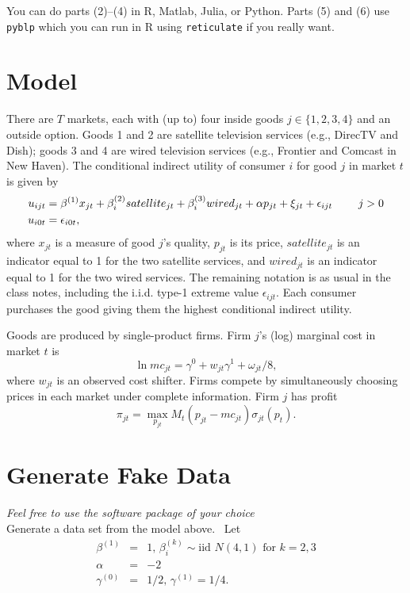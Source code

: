 \documentclass[english,11pt]{article}
\begin{document}
You can do parts (2)--(4) in R, Matlab, Julia, or Python. Parts (5) and (6) use \texttt{pyblp} which you can run in R using \texttt{reticulate} if you really want.
\section{Model}

There are $T$ markets, each with (up to) four inside goods $j\in
\{1,2,3,4\}$ and an outside option. Goods 1 and 2 are satellite television
services (e.g., DirecTV and Dish); goods 3 and 4 are wired television
services (e.g., Frontier and Comcast in New Haven).
The conditional indirect utility of consumer $i$ for good $j$ in market $t$
is given by
\begin{align*}
u_{ijt}& =\beta ^{\left( 1\right) }x_{jt}+\beta
_{i}^{(2)}satellite_{jt}+\beta _{i}^{(3)}wired_{jt}+\alpha p_{jt}+\xi
_{jt}+\epsilon _{ijt}\text{ \qquad }j>0 \\
u_{i0t}& =\epsilon _{i0t},
\end{align*}%
where $x_{jt}$ is a measure of good $j$'s quality, $p_{jt}$ is its price, $%
satellite_{jt}$ is an indicator equal to 1 for the two satellite services,
and $wired_{jt}$ is an indicator equal to 1 for the two wired services. The
remaining notation is as usual in the class notes, including the i.i.d.
type-1 extreme value $\epsilon _{ijt}$.  Each consumer purchases the good giving them the highest conditional indirect utility.

Goods are produced by single-product firms. Firm $j$'s (log) marginal
cost in market $t$ is 
\begin{equation*}
\ln mc_{jt}=\gamma ^{0}+w_{jt}\gamma ^{1}+\omega _{jt}/8,
\end{equation*}%
where $w_{jt}$ is an observed cost shifter. Firms compete by simultaneously choosing prices in each market under complete information. Firm $j$ has profit
\begin{equation*}
\pi _{jt}=\max_{p_{jt}}M_{t}(p_{jt}-mc_{jt})\sigma_{jt}(p_{t}).
\end{equation*}

\section{Generate Fake Data}
\textit{Feel free to use the software package of your choice}\\

Generate a data set from the model above. \ Let%
\begin{eqnarray*}
\beta ^{(1)} &=&1\text{, }\beta _{i}^{\left( k\right) }\sim \text{iid }%
N\left( 4,1\right) \text{ for }k=2,3 \\
\alpha  &=&-2 \\
\gamma ^{(0)} &=&1/2\text{, }\gamma ^{(1)}=1/4.
\end{eqnarray*}
\end{document}
